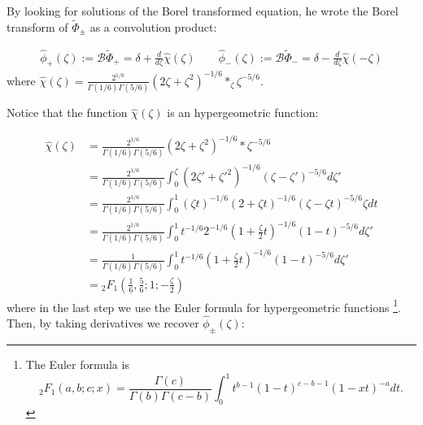 \documentclass{article}
\newcommand{\series}[1]{\tilde{#1}}
\newcommand{\borel}{\mathcal{B}}
\theoremstyle{definition}
\theoremstyle{plain}
\begin{document}
By looking for solutions of the Borel transformed equation, he wrote the Borel transform of $\series{\Phi}_{\pm}$ as a convolution product:

\begin{align*}
\hat{\phi}_+(\zeta):=\borel\series{\Phi}_+=\delta+\frac{d}{d\zeta}\hat{\chi}(\zeta)  \qquad \hat{\phi}_-(\zeta):=\borel\series{\Phi}_-=\delta-\frac{d}{d\zeta}\hat{\chi}(-\zeta)
\end{align*}
 where $\hat{\chi}(\zeta)=\frac{2^{1/6}}{\Gamma(1/6)\Gamma(5/6)}(2\zeta+\zeta^2)^{-1/6} \ast_{\zeta} \zeta^{-5/6}$.

%

Notice that the function $\hat{\chi}(\zeta)$ is an hypergeometric function:

\begin{align*}
\hat{\chi}(\zeta)&=\frac{2^{1/6}}{\Gamma(1/6)\Gamma(5/6)}(2\zeta+\zeta^2)^{-1/6}\ast \zeta^{-5/6}\\
&=\frac{2^{1/6}}{\Gamma(1/6)\Gamma(5/6)}\int_0^{\zeta}(2\zeta'+\zeta'^2)^{-1/6} (\zeta-\zeta')^{-5/6}d\zeta'\\
&=\frac{2^{1/6}}{\Gamma(1/6)\Gamma(5/6)}\int_0^{1}(\zeta t)^{-1/6}(2+\zeta t)^{-1/6} (\zeta-\zeta t)^{-5/6} \zeta dt\\
&=\frac{2^{1/6}}{\Gamma(1/6)\Gamma(5/6)}\int_0^{1} t^{-1/6} 2^{-1/6}(1+\frac{\zeta}{2} t)^{-1/6} (1-t)^{-5/6}d\zeta'\\
&=\frac{1}{\Gamma(1/6)\Gamma(5/6)}\int_0^{1} t^{-1/6} (1+\frac{\zeta}{2} t)^{-1/6} (1-t)^{-5/6}d\zeta'\\
&={}_2F_1\left(\frac{1}{6},\frac{5}{6};1;-\frac{\zeta}{2}\right)
\end{align*}
where in the last step we use the Euler formula for hypergeometric functions \footnote{The Euler formula is \begin{equation}\label{Euler formula}
{}_{2}F_1\left(a,b;c;x\right)=\frac{\Gamma(c)}{\Gamma(b)\Gamma(c-b)}\int_0^1 t^{b-1}(1-t)^{c-b-1}(1-xt)^{-a}dt.
\end{equation}}. Then, by taking derivatives we recover $\hat{\phi}_{\pm}(\zeta)$: 
\end{document}
